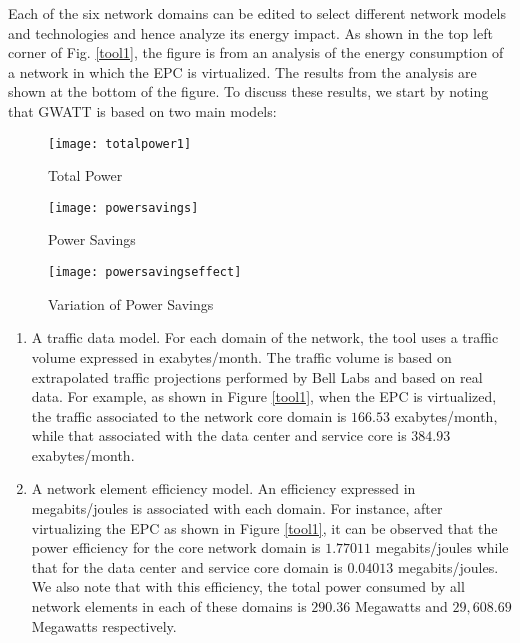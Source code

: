 \documentclass[conference]{IEEEtran}
\begin{document}
Each of the six network domains can be edited to select different network models and technologies and hence analyze its energy impact. As shown in the top left corner of Fig. \ref{tool1}, the figure is from an analysis of the energy consumption of a network in which the EPC is virtualized. The results from the analysis are shown at the bottom of the figure. To discuss these results, we start by noting that GWATT is based on two main models:
\begin{figure*}[!ht]
\begin{minipage}{.33\textwidth}
\centering
\resizebox{.95\textwidth}{!}
{\texttt{[image: totalpower1]}}
  \caption{Total Power}
  \label{totalpower}
\end{minipage}
\begin{minipage}{.33\textwidth}
\centering
\resizebox{.95\textwidth}{!}
{\texttt{[image: powersavings]}}
  \caption{Power Savings}
  \label{powersavings}
\end{minipage}
\begin{minipage}{.33\textwidth}
\centering
\resizebox{.95\textwidth}{!}
{\texttt{[image: powersavingseffect]}}
  \caption{Variation of Power Savings}
  \label{powersavingseffect}
\end{minipage}
\end{figure*}

\begin{enumerate}
\item A traffic data model. For each domain of the network, the tool uses a traffic volume expressed in exabytes/month. The traffic volume is based on extrapolated traffic projections performed by Bell Labs and based on real data. For example, as shown in Figure \ref{tool1}, when the EPC is virtualized, the traffic associated to the network core domain is $166.53$ exabytes/month, while that associated with the data center and service core is $384.93$ exabytes/month.\\
\item A network element efficiency model. An efficiency expressed in megabits/joules is associated with each domain. For instance, after virtualizing the EPC as shown in Figure \ref{tool1}, it can be observed that the power efficiency for the core network domain is $1.77011$ megabits/joules while that for the data center and service core domain is $0.04013$ megabits/joules. We also note that with this efficiency, the total power consumed by all network elements in each of these domains is $290.36$ Megawatts and $29,608.69$ Megawatts respectively.
\end{enumerate}
\end{document}
